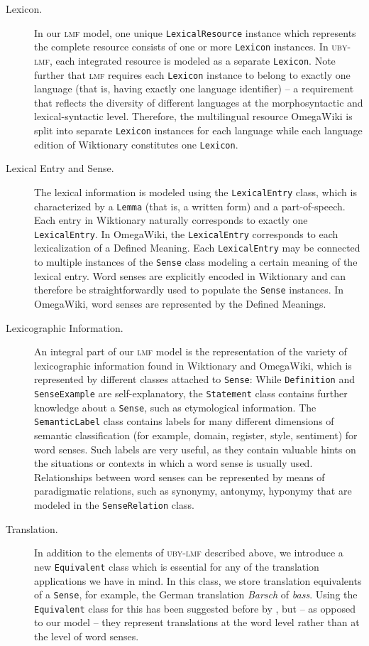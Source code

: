 \documentclass[output=paper]{LSP/langsci}
\begin{document}
\begin{description} 
\item[Lexicon.]
In our \textsc{lmf} model, one unique \texttt{LexicalResource} instance which represents the complete resource consists of one or more \texttt{Lexicon} instances. In \textsc{uby-lmf}, each integrated resource is modeled as a separate \texttt{Lexicon}. Note further that \textsc{lmf} requires each \texttt{Lexicon} instance to belong to exactly one language (that is, having exactly one language identifier) -- a requirement that reflects the diversity of different languages at the morphosyntactic and lexical-syntactic level. Therefore, the multilingual resource OmegaWiki is split into separate \texttt{Lexicon} instances for each language while each language edition of Wiktionary constitutes one \texttt{Lexicon}.

\item[Lexical Entry and Sense.]
The lexical information is modeled using the \texttt{LexicalEntry} class, which is characterized by a \texttt{Lemma} (that is, a written form)  and a part-of-speech. Each entry in Wiktionary naturally  corresponds to exactly one \texttt{LexicalEntry}. In OmegaWiki, the \texttt{LexicalEntry} corresponds to  each lexicalization of a Defined Meaning. 
Each \texttt{LexicalEntry} may be connected to multiple instances of the \texttt{Sense} class modeling a certain meaning of the lexical entry. Word senses are explicitly encoded in Wiktionary and can therefore be straightforwardly used to populate the \texttt{Sense} instances. In OmegaWiki, word senses are represented by the Defined Meanings.

\item[Lexicographic Information.]
An integral part of our \textsc{lmf} model is the representation of the variety of lexicographic information found in Wiktionary and OmegaWiki, which is represented by different classes attached to \texttt{Sense}: While \texttt{Definition} and \texttt{SenseExample} are self-explanatory, the \texttt{Statement} class contains further knowledge about a \texttt{Sense}, such as etymological information. The \texttt{SemanticLabel} class contains labels for many different dimensions of semantic classification (for example, domain, register, style, sentiment) for word senses. Such labels are very useful, as they contain valuable hints on the situations or contexts in which a word sense is usually used. Relationships between word senses can be represented by means of paradigmatic relations, such as synonymy, antonymy, hyponymy that are modeled in the \texttt{SenseRelation} class. 

\item[Translation.]
In addition to the elements of \textsc{uby-lmf} described above, we introduce a new \texttt{Equivalent} class which is essential for any of the translation applications we have in mind. In this class, we store translation equivalents of a \texttt{Sense}, for example, the German translation \textit{Barsch} of \textit{bass}. Using the \texttt{Equivalent} class for this has been suggested before by \citet{Serasset12}, but -- as opposed to our model -- they represent translations at the word level rather than at the level of word senses.
\end{description}
\end{document}
